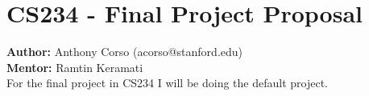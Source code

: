 \documentclass{article}
\begin{document}
\section*{CS234 - Final Project Proposal}
\textbf{Author: } Anthony Corso (acorso@stanford.edu)\\
\textbf{Mentor: } Ramtin Keramati\\

For the final project in CS234 I will be doing the default project.
\end{document}

